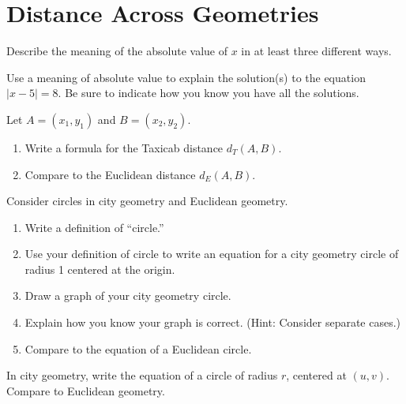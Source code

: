 \newpage

\section{Distance Across Geometries}

\begin{prob}
Describe the meaning of the absolute value of $x$ in at least three different ways.  
\end{prob}



\begin{prob}
Use a meaning of absolute value to explain the solution(s) to the equation $|x - 5| = 8$.  Be sure to indicate how you know you have all the solutions.  
\end{prob}


\begin{prob} 
Let $A = (x_1,y_1)$ and $B = (x_2,y_2)$.  
\begin{enumerate}
\item Write a formula for the Taxicab distance $d_T(A,B)$.
\item Compare to the Euclidean distance $d_E(A,B)$.
\end{enumerate}
\end{prob}

\begin{prob}Consider circles in city geometry and Euclidean geometry.  
\begin{enumerate}
\item Write a definition of ``circle.''
\item Use your definition of circle to write an equation for a city geometry circle of radius 1 centered at the origin. 
\item Draw a graph of your city geometry circle. 
\item Explain how you know your graph is correct.  (Hint:  Consider separate cases.)  
\item Compare to the equation of a Euclidean circle.  
\end{enumerate}
\end{prob}

\begin{prob}
In city geometry, write the equation of a circle of radius $r$, centered at $(u, v)$.  Compare to Euclidean geometry. 
\end{prob}


